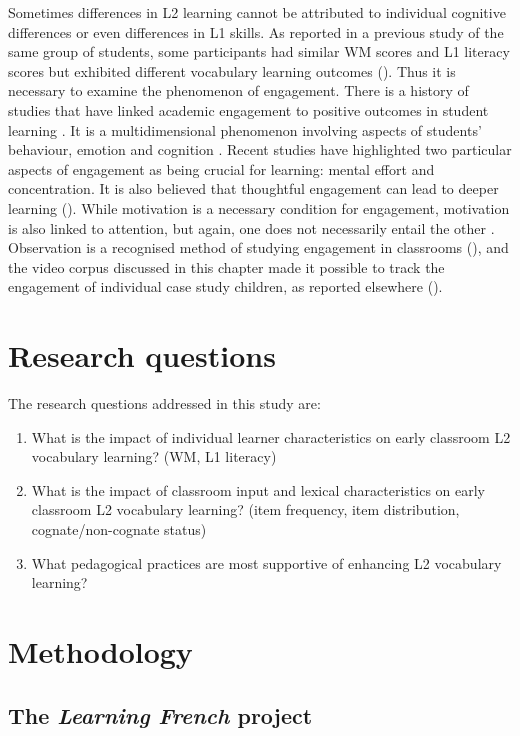 \documentclass[output=paper]{langscibook}
\begin{document}
Sometimes differences in L2 learning cannot be attributed to individual cognitive differences or even differences in L1 skills. As reported in a previous study of the same group of students, some participants had similar WM scores and L1 literacy scores but exhibited different vocabulary learning outcomes (\citealt{MitchellRule2016}). Thus it is necessary to examine the phenomenon of engagement. There is a history of studies that have linked academic engagement to positive outcomes in student learning \citep{ChristensonEtAl2012}. It is a multidimensional phenomenon involving aspects of students’ behaviour, emotion and cognition \citep{FredricksEtAl2004}. Recent studies have highlighted two particular aspects of engagement as being crucial for learning: mental effort and concentration. It is also believed that thoughtful engagement can lead to deeper learning (\citealt{BrysonHand2007}). While motivation is a necessary condition for engagement, motivation is also linked to attention, but again, one does not necessarily entail the other \citep{Baddeley1997}. Observation is a recognised method of studying engagement in classrooms (\citealt{FredricksMcColskey2012}), and the video corpus discussed in this chapter made it possible to track the engagement of individual case study children, as reported elsewhere (\citealt{MitchellRule2016,MitchellMyles2019}).

\section{Research questions}

The research questions addressed in this study are:

\begin{enumerate}
\item What is the impact of individual learner characteristics on early classroom L2 vocabulary learning? (WM, L1 literacy)
\item What is the impact of classroom input and lexical characteristics on early classroom L2 vocabulary learning? (item frequency, item distribution, cognate/non-cognate status)
\item What pedagogical practices are most supportive of enhancing L2 vocabulary learning?
\end{enumerate}

\section{Methodology}
\subsection{The \emph{Learning French} project}
\end{document}

